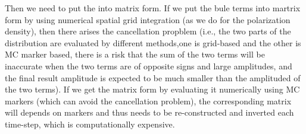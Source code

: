 \documentclass{llncs}
\newcommand{\tmcolor}[2]{{\color{#1}{#2}}}
\begin{document}
Then we need to put the \tmcolor{blue}{blue terms} into matrix form. If we put
the bule terms into martrix form by using numerical spatial grid integration
(as we do for the polarization density), then there arises the cancellation
propblem (i.e., the two parts of the distribution are evaluated by different
methods,one is grid-based and the other is MC marker based, there is a risk
that the sum of the two terms will be inaccurate when the two terms are of
opposite signs and large amplitudes, and the final result amplitude is
expected to be much smaller than the amplituded of the two terms). If we get
the matrix form by evaluating it numerically using MC markers (which can avoid
the cancellation problem), the corresponding matrix will depends on markers
and thus needs to be re-constructed and inverted each time-step, which is
computationally expensive.
\end{document}
